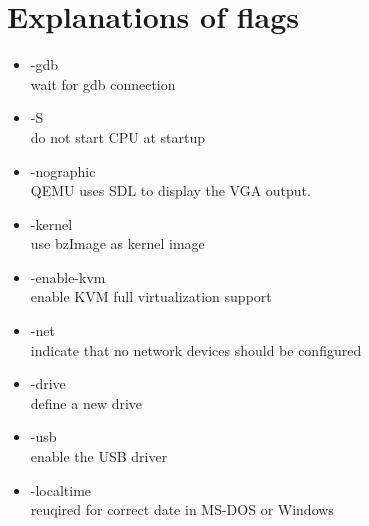 \documentclass[letterpaper,10pt]{article}
\begin{document}

\section{Explanations of flags}
    \begin{itemize}
    \item -gdb\\  
    wait for gdb connection
    \item -S\\  
    do not start CPU at startup
    \item -nographic\\
    QEMU uses SDL to display the VGA output.
    \item -kernel\\   
    use bzImage as kernel image
    \item -enable-kvm\\
    enable KVM full virtualization support
    \item -net\\
    indicate that no network devices should be configured
    \item -drive\\  
    define a new drive 
    \item -usb\\  
    enable the USB driver 
    \item -localtime\\ 
    reuqired for correct date in MS-DOS or Windows
    \end{itemize}

        
\end{document}
